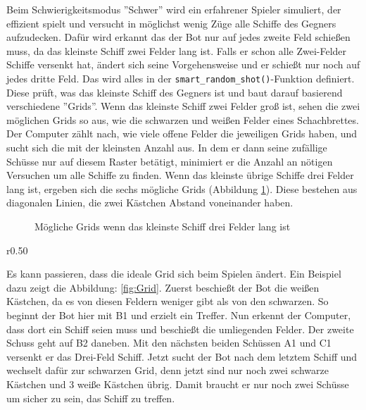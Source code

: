 \documentclass{article}
\begin{document}
\par
    Beim Schwierigkeitsmodus ''Schwer'' wird ein erfahrener Spieler simuliert, der effizient spielt und versucht in möglichst wenig Züge alle Schiffe des Gegners aufzudecken. Dafür wird erkannt das der Bot nur auf jedes zweite Feld schießen muss, da das kleinste Schiff zwei Felder lang ist. Falls er schon alle Zwei-Felder Schiffe versenkt hat, ändert sich seine Vorgehensweise und er schießt nur noch auf jedes dritte Feld. Das wird alles in der \verb$smart_random_shot()$-Funktion definiert. Diese prüft, was das kleinste Schiff des Gegners ist und baut darauf basierend verschiedene ''Grids''. Wenn das kleinste Schiff zwei Felder groß ist, sehen die zwei möglichen Grids so aus, wie die schwarzen und weißen Felder eines Schachbrettes. Der Computer zählt nach, wie viele offene Felder die jeweiligen Grids haben, und sucht sich die mit der kleinsten Anzahl aus. In dem er dann seine zufällige Schüsse nur auf diesem Raster betätigt, minimiert er die Anzahl an nötigen Versuchen um alle Schiffe zu finden. Wenn das kleinste übrige Schiffe drei Felder lang ist, ergeben sich die sechs mögliche Grids (Abbildung \ref{fig:3 field ship grids}). Diese bestehen aus diagonalen Linien, die zwei Kästchen Abstand voneinander haben.

\begin{figure}[H]
    \centering
    
    \caption{Mögliche Grids wenn das kleinste Schiff drei Felder lang ist}
    \label{fig:3 field ship grids}
\end{figure}

\begin{wrapfigure}{r}{0.50\textwidth}
    \centering
    
    \caption{Beispiel eines Grid-Wechsels}
    \label{fig:Grid}
\end{wrapfigure}

\par
    Es kann passieren, dass die ideale Grid sich beim Spielen ändert. Ein Beispiel dazu zeigt die Abbildung: \ref{fig:Grid}. Zuerst beschießt der Bot die weißen Kästchen, da es von diesen Feldern weniger gibt als von den schwarzen. So beginnt der Bot hier mit B1 und erzielt ein Treffer. Nun erkennt der Computer, dass dort ein Schiff seien muss und beschießt die umliegenden Felder. Der zweite Schuss geht auf B2 daneben. Mit den nächsten beiden Schüssen A1 und C1 versenkt er das Drei-Feld Schiff. Jetzt sucht der Bot nach dem letztem Schiff und wechselt dafür zur schwarzen Grid, denn jetzt sind nur noch zwei schwarze Kästchen und 3 weiße Kästchen übrig. Damit braucht er nur noch zwei Schüsse um sicher zu sein, das Schiff zu treffen.\\
\end{document}
